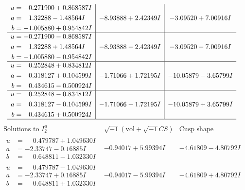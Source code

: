 \documentclass[1p]{elsarticle_modified}
\theoremstyle{definition}
\newcommand{\I}{\sqrt{-1}}
\begin{document}
$$\begin{array}{c|c|c}
\begin{aligned}
u &= -0.271900 + 0.868587 I \\
a &= \phantom{-}1.32288 - 1.48564 I \\
b &= -1.005880 + 0.954842 I\end{aligned}
 & -8.93888 + 2.42349 I & -3.09520 + 7.00916 I \\ \hline\begin{aligned}
u &= -0.271900 - 0.868587 I \\
a &= \phantom{-}1.32288 + 1.48564 I \\
b &= -1.005880 - 0.954842 I\end{aligned}
 & -8.93888 - 2.42349 I & -3.09520 - 7.00916 I \\ \hline\begin{aligned}
u &= \phantom{-}0.252848 + 0.834812 I \\
a &= \phantom{-}0.318127 + 0.104599 I \\
b &= \phantom{-}0.434615 - 0.500924 I\end{aligned}
 & -1.71066 + 1.72195 I & -10.05879 - 3.65799 I \\ \hline\begin{aligned}
u &= \phantom{-}0.252848 - 0.834812 I \\
a &= \phantom{-}0.318127 - 0.104599 I \\
b &= \phantom{-}0.434615 + 0.500924 I\end{aligned}
 & -1.71066 - 1.72195 I & -10.05879 + 3.65799 I\\
 \hline 
 \end{array}$$\newpage$$\begin{array}{c|c|c}  
\text{Solutions to }I^u_{2}& \I (\text{vol} + \sqrt{-1}CS) & \text{Cusp shape}\\
 \hline 
\begin{aligned}
u &= \phantom{-}0.479787 + 1.049630 I \\
a &= -2.33747 - 0.16885 I \\
b &= \phantom{-}0.648811 - 1.032330 I\end{aligned}
 & -0.94017 + 5.99394 I & -4.61809 - 4.80792 I \\ \hline\begin{aligned}
u &= \phantom{-}0.479787 - 1.049630 I \\
a &= -2.33747 + 0.16885 I \\
b &= \phantom{-}0.648811 + 1.032330 I\end{aligned}
 & -0.94017 - 5.99394 I & -4.61809 + 4.80792 I \\ \hline\begin{aligned}

\end{aligned}
\end{array}$$
\end{document}
